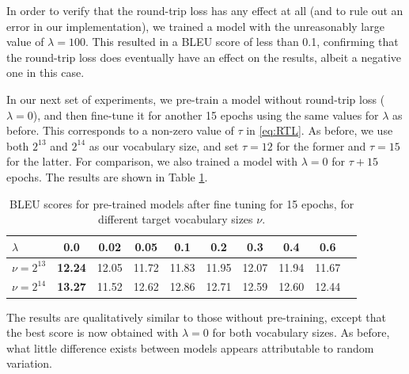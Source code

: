 \documentclass[11pt,a4paper]{article}
\begin{document}
In order to verify that the round-trip loss has any effect at all (and to rule out an error in our implementation), we trained a model with the unreasonably large value of $\lambda=100$. This resulted in a BLEU score of less than 0.1, confirming that the round-trip loss does eventually have an effect on the results, albeit a negative one in this case.

In our next set of experiments, we pre-train a model without round-trip loss ($\lambda=0$), and then fine-tune it for another 15 epochs using the same values for $\lambda$ as before. This corresponds to a non-zero value of $\tau$ in \eqref{eq:RTL}. As before, we use both $2^{13}$ and $2^{14}$ as our vocabulary size, and set $\tau=12$ for the former and $\tau=15$ for the latter. For comparison, we also trained a model with $\lambda=0$ for $\tau+15$ epochs. The results are shown in Table \ref{tab:result2}.

\begin{table} [ht]
\centering
\small
\begin{tabular}{ l || c | c | c | c | c | c | c | c | c  }
  $\lambda$ & 0.0 & 0.02 & 0.05 & 0.1 & 0.2 & 0.3 & 0.4 & 0.6 \\ \hline
  $\nu=2^{13}$ & \textbf{12.24} & 12.05 & 11.72 & 11.83 & 11.95 & 12.07 & 11.94 & 11.67 \\
  $\nu=2^{14}$ & \textbf{13.27} & 11.52 & 12.62 & 12.86 & 12.71 & 12.59 & 12.60 & 12.44 \\
\end{tabular}
\caption{BLEU scores for pre-trained models after fine tuning for 15 epochs, for different target vocabulary sizes $\nu$.}
\label{tab:result2}
\end{table}

The results are qualitatively similar to those without pre-training, except that the best score is now obtained with $\lambda=0$ for both vocabulary sizes. As before, what little difference exists between models appears attributable to random variation.
\end{document}
